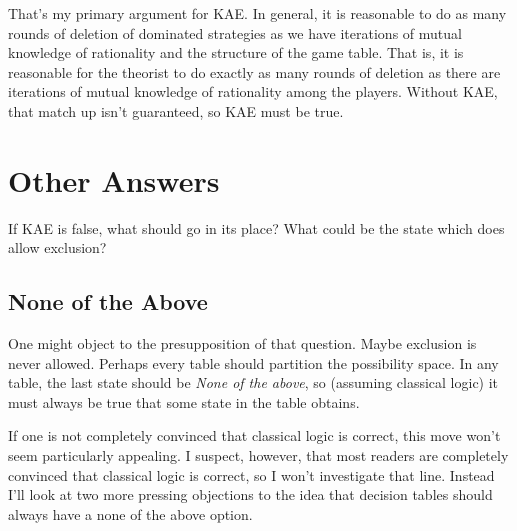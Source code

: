 \documentclass[
  10pt,
  letterpaper,
  twoside]{scrbook}
\begin{document}
That's my primary argument for KAE. In general, it is reasonable to do
as many rounds of deletion of dominated strategies as we have iterations
of mutual knowledge of rationality and the structure of the game table.
That is, it is reasonable for the theorist to do exactly as many rounds
of deletion as there are iterations of mutual knowledge of rationality
among the players. Without KAE, that match up isn't guaranteed, so KAE
must be true.

\section{Other Answers}\label{sec-other-answers}

If KAE is false, what should go in its place? What could be the state
which does allow exclusion?

\subsection{None of the Above}\label{sec-none-of-the-above}

One might object to the presupposition of that question. Maybe exclusion
is never allowed. Perhaps every table should partition the possibility
space. In any table, the last state should be \emph{None of the above},
so (assuming classical logic) it must always be true that some state in
the table obtains.

If one is not completely convinced that classical logic is correct, this
move won't seem particularly appealing. I suspect, however, that most
readers are completely convinced that classical logic is correct, so I
won't investigate that line. Instead I'll look at two more pressing
objections to the idea that decision tables should always have a none of
the above option.
\end{document}
